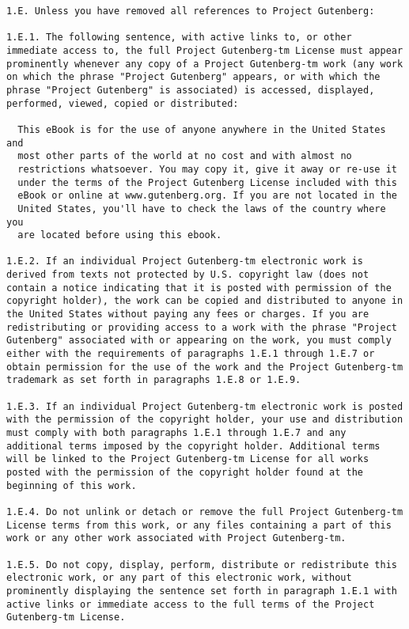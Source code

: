 \documentclass[oneside]{book}
\begin{document}
\begin{verbatim}
1.E. Unless you have removed all references to Project Gutenberg:

1.E.1. The following sentence, with active links to, or other
immediate access to, the full Project Gutenberg-tm License must appear
prominently whenever any copy of a Project Gutenberg-tm work (any work
on which the phrase "Project Gutenberg" appears, or with which the
phrase "Project Gutenberg" is associated) is accessed, displayed,
performed, viewed, copied or distributed:

  This eBook is for the use of anyone anywhere in the United States and
  most other parts of the world at no cost and with almost no
  restrictions whatsoever. You may copy it, give it away or re-use it
  under the terms of the Project Gutenberg License included with this
  eBook or online at www.gutenberg.org. If you are not located in the
  United States, you'll have to check the laws of the country where you
  are located before using this ebook.

1.E.2. If an individual Project Gutenberg-tm electronic work is
derived from texts not protected by U.S. copyright law (does not
contain a notice indicating that it is posted with permission of the
copyright holder), the work can be copied and distributed to anyone in
the United States without paying any fees or charges. If you are
redistributing or providing access to a work with the phrase "Project
Gutenberg" associated with or appearing on the work, you must comply
either with the requirements of paragraphs 1.E.1 through 1.E.7 or
obtain permission for the use of the work and the Project Gutenberg-tm
trademark as set forth in paragraphs 1.E.8 or 1.E.9.

1.E.3. If an individual Project Gutenberg-tm electronic work is posted
with the permission of the copyright holder, your use and distribution
must comply with both paragraphs 1.E.1 through 1.E.7 and any
additional terms imposed by the copyright holder. Additional terms
will be linked to the Project Gutenberg-tm License for all works
posted with the permission of the copyright holder found at the
beginning of this work.

1.E.4. Do not unlink or detach or remove the full Project Gutenberg-tm
License terms from this work, or any files containing a part of this
work or any other work associated with Project Gutenberg-tm.

1.E.5. Do not copy, display, perform, distribute or redistribute this
electronic work, or any part of this electronic work, without
prominently displaying the sentence set forth in paragraph 1.E.1 with
active links or immediate access to the full terms of the Project
Gutenberg-tm License.


\end{verbatim}
\end{document}

